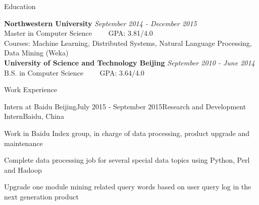 \documentclass{resume} %
\begin{document}

\begin{rSection}{Education}

{\bf Northwestern University} \hfill {\em September 2014 - December 2015} \\ 
Master in Computer Science~~~~
GPA: 3.81/4.0\\
Courses: Machine Learning, Distributed Systems, Natural Language Processing, Data Mining (Weka)\\
{\bf University of Science and Technology Beijing} \hfill {\em September 2010 - June 2014} \\ 
B.S. in Computer Science~~~~
GPA: 3.64/4.0
\end{rSection}


\begin{rSection}{Work Experience}
\begin{rSubsection}{Intern at Baidu Beijing}{July 2015 - September 2015}{Research and Development Intern}{Baidu, China}
\item Work in Baidu Index group, in charge of data processing, product upgrade and maintenance
\item Complete data processing job for several special data topics using Python, Perl and Hadoop
\item Upgrade one module mining related query words based on user query log in the next generation product
\end{rSubsection}
\end{rSection}
\end{document}
